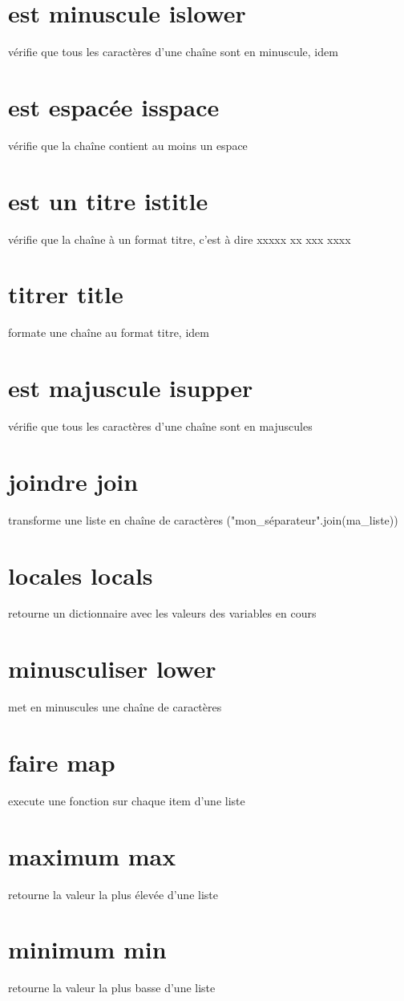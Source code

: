 \documentclass{book}
\begin{document}
\section{est minuscule islower }
  vérifie que tous les caractères d'une chaîne sont en minuscule, idem 
\section{est espacée isspace }
  vérifie que la chaîne contient au moins un espace
\section{est un titre istitle }
  vérifie que la chaîne à un format titre, c'est à dire xxxxx xx xxx xxxx 
\section{titrer title }
  formate une chaîne au format titre, idem
\section{est majuscule isupper }
  vérifie que tous les caractères d'une chaîne sont en majuscules 
\section{joindre join }
  transforme une liste en chaîne de caractères ("mon\_séparateur".join(ma\_liste))
\section{locales locals }
  retourne un dictionnaire avec les valeurs des variables en cours 
\section{minusculiser lower }
  met en minuscules une chaîne de caractères
\section{faire map }
  execute une fonction sur chaque item d'une liste
\section{maximum max }
  retourne la valeur la plus élevée d'une liste 
\section{minimum min }
  retourne la valeur la plus basse d'une liste
\end{document}

